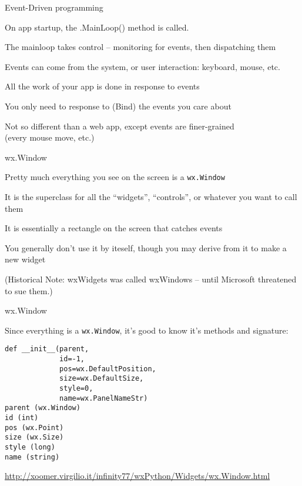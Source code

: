 \documentclass{beamer}
\begin{document}
\begin{frame}[fragile]{Event-Driven programming}

\vfill
{\large On app startup, the .MainLoop() method is called.}

\vfill
{\large The mainloop takes control -- monitoring for events, then dispatching them}

\vfill
{\large Events can come from the system, or user interaction: keyboard, mouse, etc.}

\vfill
{\large All the work of your app is done in response to events}

\vfill
{\large You only need to response to (Bind) the events you care about}

\vfill
{\large Not so different than a web app, except events are finer-grained}\\
(every mouse move, etc.)


\end{frame}


\begin{frame}[fragile]{wx.Window}

\vfill
{\Large Pretty much everything you see on the screen is a \verb`wx.Window`}

\vfill
{\Large It is the superclass for all the ``widgets'', ``controls'', or whatever you want to call them}

\vfill
{\Large It is essentially a rectangle on the screen that catches events}

\vfill
{\Large You generally don't use it by iteself, though you may derive from it to make a new widget}

\vfill
{\large(Historical Note: wxWidgets was called wxWindows -- until Microsoft threatened to sue them.)}

\end{frame}

\begin{frame}[fragile]{wx.Window}

\vfill
{\Large Since everything is a \verb`wx.Window`, it's good to know it's methods and signature:}
\begin{verbatim}
def __init__(parent,
             id=-1,
             pos=wx.DefaultPosition,
             size=wx.DefaultSize,
             style=0,
             name=wx.PanelNameStr)
parent (wx.Window)
id (int)
pos (wx.Point)
size (wx.Size)
style (long)
name (string)
\end{verbatim}

\vfill
\url{http://xoomer.virgilio.it/infinity77/wxPython/Widgets/wx.Window.html}

\end{frame}
\end{document}
